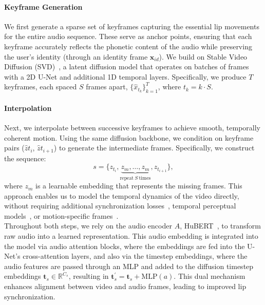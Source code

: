 \paragraph{Keyframe Generation}
We first generate a sparse set of keyframes capturing the essential lip movements for the entire audio sequence. These serve as anchor points, ensuring that each keyframe accurately reflects the phonetic content of the audio while preserving the user’s identity (through an identity frame $\mathbf{x}_{id}$). We build on Stable Video Diffusion (SVD)~\cite{blattmann2023stablevideodiffusionscaling}, a latent diffusion model that operates on batches of frames with a 2D U-Net and additional 1D temporal layers. Specifically, we produce $T$ keyframes, each spaced $S$ frames apart,
$\{\hat{x}_{t_k}\}_{k=1}^T$, where $t_k = k \cdot S$.

\paragraph{Interpolation}
Next, we interpolate between successive keyframes to achieve smooth, temporally coherent motion. Using the same diffusion backbone, we condition on keyframe pairs ($\hat{z}{t_i}$, $\hat{z}{t_{i+1}}$) to generate the intermediate frames. Specifically, we construct the sequence:
\begin{equation}
    s = \{z_{t_i}, \underbrace{z_m, \dots, z_m}_{\text{repeat} \ S \ \text{times}}, z_{t_{i+1}} \},
\end{equation}
where $z_m$ is a learnable embedding that represents the missing frames. This approach enables us to model the temporal dynamics of the video directly, without requiring additional synchronization losses~\cite{diff2lip}, temporal perceptual models~\cite{latentsync}, or motion-specific frames~\cite{michaldub}. \\

Throughout both steps, we rely on the audio encoder  $A$, HuBERT~\cite{hubert}, to transform raw audio into a learned representation. This audio embedding is integrated into the model via audio attention blocks, where the embeddings are fed into the U-Net's cross-attention layers, and also via the timestep embeddings, where the audio features are passed through an MLP and added to the diffusion timestep embeddings $\mathbf{t}_s \in \mathbb{R}^{C_s}$, resulting in $ \mathbf{t}^{\prime}_s = \mathbf{t}_s + \text{MLP}(a)$. This dual mechanism enhances alignment between video and audio frames, leading to improved lip synchronization.

